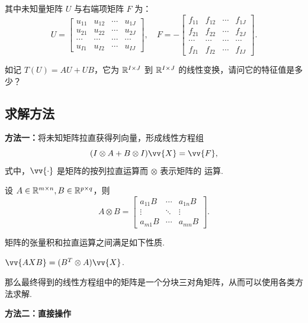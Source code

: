 其中未知量矩阵 $U$ 与右端项矩阵 $F$ 为：
\[ U = \begin{bmatrix}
u_{11} & u_{12} & \cdots & u_{1J} \\
u_{21} & u_{22} & \cdots & u_{2J} \\
\cdots & \cdots & \cdots & \cdots \\
u_{I1} & u_{I2} & \cdots & u_{IJ}
\end{bmatrix}, \quad
F = -\begin{bmatrix}
f_{11} & f_{12} & \cdots & f_{1J} \\
f_{21} & f_{22} & \cdots & f_{2J} \\
\cdots & \cdots & \cdots & \cdots \\
f_{I1} & f_{I2} & \cdots & f_{IJ}
\end{bmatrix}. \]

\begin{question}
    如记 $T(U) = AU + UB$，它为 $\mathbb{R}^{I \times J}$ 到 $\mathbb{R}^{I \times J}$ 的线性变换，请问它的特征值是多少？
\end{question}


\subsection{求解方法}


\noindent\textbf{方法一：}将未知矩阵拉直获得列向量，形成线性方程组
    \[ (I \otimes A + B \otimes I)\vv{X} = \vv{F}, \]
    式中，$\vv{\cdot}$ 是矩阵的按列拉直运算而 $\otimes$ 表示矩阵的  运算.
\begin{definition}
    设 $A \in \mathbb{R}^{m \times n}, B \in \mathbb{R}^{p \times q}$，则
    \[ A \otimes B = \begin{bmatrix}
    a_{11}B & \cdots & a_{1n}B \\
    \vdots & \ddots & \vdots \\
    a_{m1}B & \cdots & a_{mn}B
    \end{bmatrix}. \]
\end{definition}
矩阵的张量积和拉直运算之间满足如下性质.
\begin{property}
    $\vv{AXB} = (B^T \otimes A)\vv{X}$.
\end{property}
那么最终得到的线性方程组中的矩阵是一个分块三对角矩阵，从而可以使用各类方法求解.

\noindent\textbf{方法二：直接操作}\par

